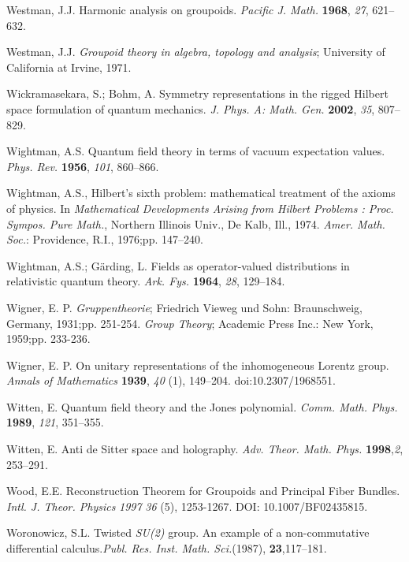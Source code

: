 \documentclass[12pt]{article}
\theoremstyle{plain}
\theoremstyle{definition}
\numberwithin{equation}{section}
\begin{document}
\begin{thebibliography}{99}
Westman, J.J. Harmonic analysis on groupoids. {\em Pacific J. Math.} {\bf 1968}, {\em 27}, 621--632.

Westman, J.J. {\em Groupoid theory in algebra, topology and analysis}; University of California at Irvine, 1971.

Wickramasekara, S.; Bohm, A. Symmetry representations in the rigged Hilbert space formulation of quantum mechanics. {\em J. Phys. A: Math. Gen.} {\bf 2002}, {\em 35}, 807--829.


Wightman, A.S. Quantum field theory in terms of vacuum expectation values. {\em Phys. Rev.} {\bf 1956}, {\em 101}, 860--866.

Wightman, A.S., Hilbert's sixth problem: mathematical treatment of the axioms of physics. In {\em Mathematical Developments Arising from Hilbert Problems : Proc. Sympos. Pure Math.}, Northern Illinois Univ., De Kalb, Ill., 1974. {\em Amer. Math. Soc.}: Providence, R.I., 1976;pp. 147--240.

Wightman, A.S.; G\"arding, L. Fields as operator-valued distributions in relativistic quantum theory. {\em Ark. Fys.} {\bf 1964}, {\em 28}, 129--184.

Wigner, E. P. \emph {Gruppentheorie}; Friedrich Vieweg und Sohn: Braunschweig, Germany, 1931;pp. 251-254. {\em Group Theory}; Academic Press Inc.: New York, 1959;pp. 233-236.

Wigner, E. P. On unitary representations of the inhomogeneous Lorentz group. {\em Annals of Mathematics} {\bf 1939}, {\em 40} (1), 149--204. doi:10.2307/1968551.

Witten, E. Quantum field theory and the Jones polynomial. {\em Comm. Math. Phys.} {\bf 1989}, {\em 121}, 351--355.

Witten, E. Anti de Sitter space and holography. {\em Adv. Theor. Math. Phys.} {\bf 1998},{\em 2}, 253--291.

Wood, E.E. Reconstruction Theorem for Groupoids and Principal Fiber Bundles. {\em Intl. J. Theor. Physics} {\em 1997} {\em 36} (5), 1253-1267. DOI: 10.1007/BF02435815.

Woronowicz, S.L. Twisted {\em SU(2)} group. An example of a non-commutative differential calculus.{\em Publ. Res. Inst. Math. Sci.}(1987), {\bf 23},117--181.


\end{thebibliography}
\end{document}
